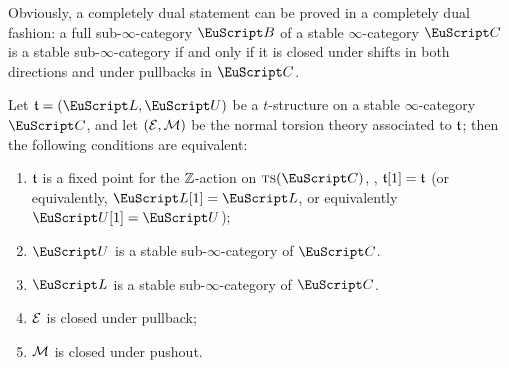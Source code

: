 \begin{remark}\label{oss.shifts.pullback}
Obviously, a completely dual statement can be proved in a completely dual fashion:  a full sub-$\infty$-category $\cB$ of a stable $\infty$-category $\C$ is a stable sub-$\infty$-category if and only if it is closed under shifts in both directions and under pullbacks in $\C$.
\end{remark}
\begin{proposition}\label{stableare}
Let $\tee=(\cate{L},\cate{U})$ be a $t$-structure on a stable $\infty$-category $\C$, and let $(\mathcal{E},\mathcal{M})$ be the normal torsion theory associated to $\mathfrak{t}$; then the following conditions are equivalent:
\begin{enumerate}
\item $\mathfrak{t}$ is a fixed point for the $\mathbb{Z} $-action on $\ts(\C)$, \ie, $\mathfrak{t}[1]=\mathfrak{t}$ (or equivalently, $\cate{L}[1]= \cate{L}$, or equivalently $\cate{U}[1]=\cate{U}$);
\item $\cate{U}$ is a stable sub-$\infty$-category of $\C$.
\item $\cate{L}$ is a stable sub-$\infty$-category of $\C$.
\item $\mathcal{E}$ is closed under pullback;
\item $\mathcal{M}$ is closed under pushout.
\end{enumerate}
\end{proposition}
